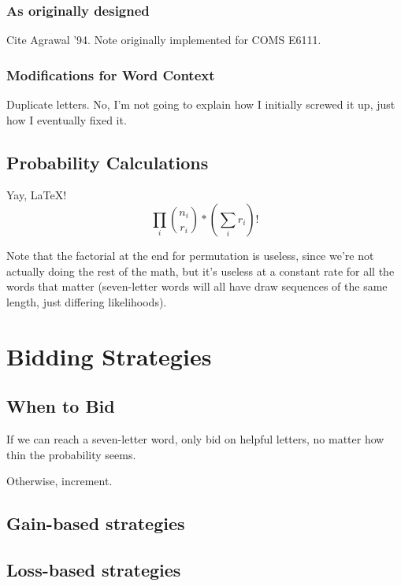 \documentclass[11pt]{article}
\begin{document}
\subsubsection{As originally designed}

Cite Agrawal '94.  Note originally implemented for COMS E6111.

\subsubsection{Modifications for Word Context}

Duplicate letters.  No, I'm not going to explain how I initially screwed it up, just how I eventually fixed it.

\subsection{Probability Calculations} %

Yay, \LaTeX!
$$\prod_{i}{n_{i}\choose r_{i}}*\left( \sum_{i}r_{i}\right)!$$

Note that the factorial at the end for permutation is useless, since we're not actually doing the rest of the math, but it's useless at a constant rate for all the words that matter (seven-letter words will all have draw sequences of the same length, just differing likelihoods).

\section{Bidding Strategies}

\subsection{When to Bid}

If we can reach a seven-letter word, only bid on helpful letters, no matter how thin the probability seems.

Otherwise, increment.

\subsection{Gain-based strategies}



\subsection{Loss-based strategies}
\end{document}
